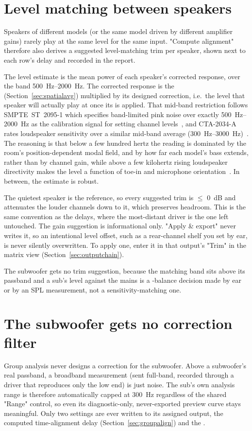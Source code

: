\section{Level matching between speakers}\label{sec:grouplevel}
Speakers of different models (or the same model driven by different amplifier gains) rarely play at the same level for the same input. "Compute alignment" therefore also derives a suggested level-matching trim per speaker, shown next to each row's delay and recorded in the report.

The level estimate is the mean power of each speaker's corrected response, over the band \SIrange{500}{2000}{\hertz}. The corrected response is the   (Section~\ref{sec:spatialavg}) multiplied by its designed correction, i.e.\ the level that speaker will actually play at once its  is applied. That mid-band restriction follows SMPTE~ST~2095-1 which specifies band-limited pink noise over exactly \SIrange{500}{2000}{\hertz} as the calibration signal for setting channel levels~\cite{SMPTE2095}, and CTA-2034-A rates loudspeaker sensitivity over a similar mid-band average (\SIrange{300}{3000}{\hertz})~\cite{CTA2034}. The reasoning is that below a few hundred hertz the reading is dominated by the room's position-dependent modal field, and by how far each model's bass extends, rather than by channel gain, while above a few kilohertz rising loudspeaker directivity makes the level a function of toe-in and microphone orientation~\cite{Toole}. In between, the estimate is robust.

The quietest speaker is the reference, so every suggested trim is $\le$ \SI{0}{dB} and attenuates the louder channels down to it, which preserves headroom. This is the same convention as the delays, where the most-distant driver is the one left untouched. The gain suggestion is informational only. "Apply \& export" never writes it, so an intentional level offset, such as a rear-channel shelf you set by ear, is never silently overwritten. To apply one, enter it in that output's "Trim" in the matrix view (Section~\ref{sec:outputchain}).

The subwoofer gets no trim suggestion, because the matching band sits above its passband and a sub's level against the mains is a -balance decision made by ear or by an SPL measurement, not a sensitivity-matching one.

\section{The subwoofer gets no correction filter}\label{sec:groupsub}
Group analysis never designs a correction  for the subwoofer. Above a subwoofer's real passband, a broadband measurement (sent full-band, recorded through a driver that reproduces only the low end) is just noise. The sub's own analysis range is therefore automatically capped at \SI{300}{Hz} regardless of the shared "Range" control, so even its diagnostic-only, never-exported preview curve stays meaningful. Only two settings are ever written to its assigned output, the computed time-alignment delay (Section~\ref{sec:groupalign}) and the .

